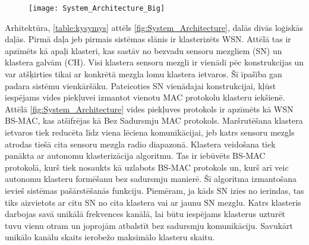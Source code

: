 \begin{figure}[h]
\begin{center}
\texttt{[image: System\_Architecture\_Big]}
\end{center}
\caption{\textbf{\fontsize{11}{12}\selectfont {Divu līmeņu klasterizēta WSN arhitektūra}}}
\label{fig:System_Architecture1}
\end{figure}
Arhitektūra, {\ref{table:kysymys}} attēls {\ref{fig:System_Architecture}}, dalās divās loģiskās daļās. Pirmā daļa jeb pirmais sistēmas slānis ir klasterizēts WSN. Attēlā tas ir apzīmēts kā apaļi klasteri, kas sastāv no bezvadu sensoru mezgliem (SN) un klastera galvām (CH). Visi klastera sensoru mezgli ir vienādi pēc konstrukcijas un var atšķirties tikai ar konkrētā mezgla lomu klastera ietvaros. Šī īpašība gan padara sistēmu vienkāršāku. Pateicoties SN vienādajai konstrukcijai, kļūst iespējams vides piekļuvei izmantot vienotu MAC protokolu klasteru iekšienē. Attēlā \upshape \ref{fig:System_Architecture} vides piekļuves protokols ir apzīmēts kā WSN BS-MAC, kas atšifrējas kā Bez Sadursmju MAC protokols. Maršrutēšana klastera ietvaros tiek reducēta līdz viena lēciena komunikācijai, jeb katrs sensoru mezgls atrodas tiešā cita sensoru mezgla radio diapazonā. Klastera veidošana tiek panākta ar autonomu klasterizācija algoritmu. Tas ir iebūvēts BS-MAC protokolā, kurš tiek nosaukts kā uzlabots BS-MAC protokols un, kurš arī veic autonomu klasteru formēšanu bez sadursmju manierē. Šī algoritma izmantošana ievieš sistēmas pašārstēšanās funkciju. Piemēram, ja kāds SN izies no ierindas, tas tiks aizvietots ar citu SN no cita klastera vai ar jaunu SN mezglu. Katrs klasteris darbojas savā unikālā frekvences kanālā, lai būtu iespējams klasterus uzturēt tuvu vienu otram un joprojām atbalstīt bez sadursmju komunikāciju. Savukārt unikālo kanālu skaits ierobežo maksimālo klasteru skaitu.

